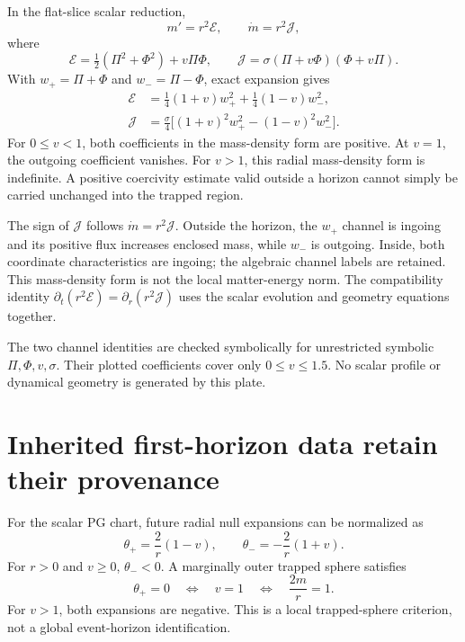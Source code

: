 In the flat-slice scalar reduction,
\[
m'=r^2\mathcal E,\qquad \dot m=r^2\mathcal J,
\]
where
\[
\mathcal E=\tfrac12(\Pi^2+\Phi^2)+v\Pi\Phi,
\qquad
\mathcal J=\sigma(\Pi+v\Phi)(\Phi+v\Pi).
\]
With $w_+=\Pi+\Phi$ and $w_-=\Pi-\Phi$, exact expansion gives
\[
\begin{aligned}
\mathcal E&=\tfrac14(1+v)w_+^2+\tfrac14(1-v)w_-^2,\\
\mathcal J&=\tfrac\sigma4\bigl[(1+v)^2w_+^2-(1-v)^2w_-^2\bigr].
\end{aligned}
\]
For $0\le v<1$, both coefficients in the mass-density form are positive. At $v=1$, the outgoing coefficient vanishes. For $v>1$, this radial mass-density form is indefinite. A positive coercivity estimate valid outside a horizon cannot simply be carried unchanged into the trapped region.

The sign of $\mathcal J$ follows $\dot m=r^2\mathcal J$. Outside the horizon, the $w_+$ channel is ingoing and its positive flux increases enclosed mass, while $w_-$ is outgoing. Inside, both coordinate characteristics are ingoing; the algebraic channel labels are retained. This mass-density form is not the local matter-energy norm. The compatibility identity $\partial_t(r^2\mathcal E)=\partial_r(r^2\mathcal J)$ uses the scalar evolution and geometry equations together.

The two channel identities are checked symbolically for unrestricted symbolic $\Pi,\Phi,v,\sigma$. Their plotted coefficients cover only $0\le v\le1.5$. No scalar profile or dynamical geometry is generated by this plate.



\clearpage
\section{Inherited first-horizon data retain their provenance}

For the scalar PG chart, future radial null expansions can be normalized as
\[
\theta_+=\frac2r(1-v),\qquad
\theta_-=-\frac2r(1+v).
\]
For $r>0$ and $v\ge0$, $\theta_-<0$. A marginally outer trapped sphere satisfies
\[
\theta_+=0\quad\Longleftrightarrow\quad v=1
\quad\Longleftrightarrow\quad\frac{2m}{r}=1.
\]
For $v>1$, both expansions are negative. This is a local trapped-sphere criterion, not a global event-horizon identification.

